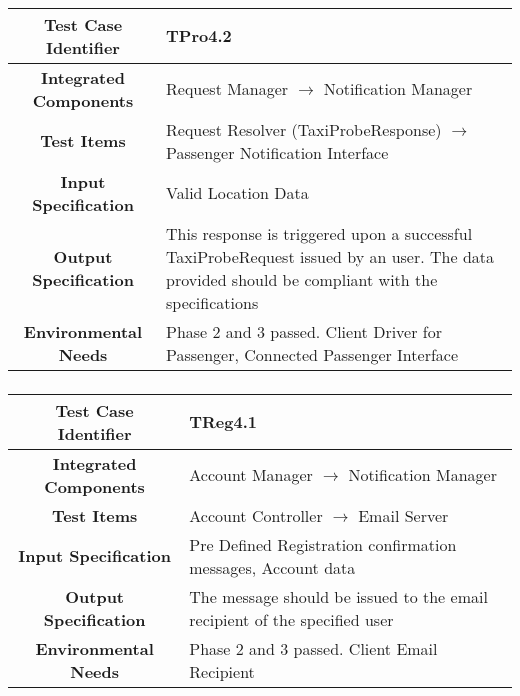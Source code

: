 \documentclass[11pt, a4paper,titlepage]{article}
\begin{document}
			\subsubsection{}
			\begin{tabularx}{\textwidth}{| c|X|}
				\hline \textbf{Test Case Identifier} & \label{TPro4.2}TPro4.2 \\
				\hline \textbf{Integrated Components} &  Request Manager $\rightarrow $ Notification Manager \\
				\hline \textbf{Test Items} & Request Resolver (TaxiProbeResponse) $\rightarrow $ Passenger Notification Interface \\
				\hline \textbf{Input Specification} & Valid Location Data \\
				\hline \textbf{Output Specification} & This response is triggered upon a successful TaxiProbeRequest issued by an user. \newline
				The data provided should be compliant with the specifications \\
				\hline \textbf{Environmental Needs} & Phase 2 and 3 passed. Client Driver for Passenger, Connected Passenger Interface \\
				\hline
			\end{tabularx}
			\newline
			\subsubsection{}
			\begin{tabularx}{\textwidth}{| c|X|}
				\hline \textbf{Test Case Identifier} & \label{TReg4.1}TReg4.1 \\
				\hline \textbf{Integrated Components} & Account Manager $\rightarrow $ Notification Manager \\
				\hline \textbf{Test Items} & Account Controller $\rightarrow $ Email Server \\
				\hline \textbf{Input Specification} & Pre Defined Registration confirmation messages, Account data \\
				\hline \textbf{Output Specification} & The message should be issued to the email recipient of the specified user \\
				\hline \textbf{Environmental Needs} & Phase 2 and 3 passed. Client Email Recipient \\
				\hline
			\end{tabularx}
			\newline
\end{document}
